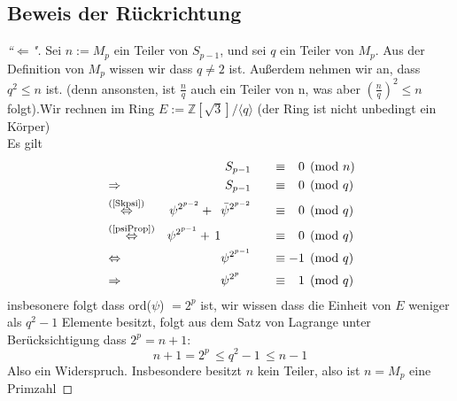 \documentclass{article}
\newcommand{\Integer}{\ensuremath{\mathbb{Z}}}
\begin{document}
\subsection{Beweis der R\"{u}ckrichtung}
\begin{proof}[``$\Leftarrow$"]
Sei $n := M_p$ ein Teiler von $S_{p-1}$, und sei $q$ ein Teiler von $M_p$.
Aus der Definition von $M_p$ wissen wir dass $q\neq2$ ist. Au\ss erdem nehmen wir an, dass $q^2 \leq n$ ist. (denn ansonsten, ist $\frac{n}{q}$ auch ein Teiler von n, was aber $(\frac{n}{q})^2 \leq n$ folgt).Wir rechnen im Ring $E  := \Integer[\sqrt{3}]/\langle q \rangle$ (der Ring ist nicht unbedingt ein K\"{o}rper)\\
Es gilt
\begin{alignat*}{4}
	&\phantom{\Rightarrow a} &S_{p-1} \quad &&\equiv{\phantom{-}0} &\pmod{n} \\
	&\Rightarrow &S_{p-1} 		\quad   &&\equiv{\phantom{-}0} &\pmod{q}\\
	&\overset{\text{(\ref{Skpsi})}}{\Leftrightarrow} &\psi^{2^{p-2}} + \phantom{1}\bar{\psi}^{2^{p-2}} \quad &&\equiv{\phantom{-}0} &\pmod{q}\\
	&\overset{\text{(\ref{psiProp})}}{\Leftrightarrow} &\psi^{2^{p-1}} + \,1 \phantom{\bar{\psi}^{2^{p-2}}} \quad &&\equiv{\phantom{-}0}  &\pmod{q}\\
	&\Leftrightarrow &\psi^{2^{p-1}} \quad &&\equiv{-1} &\pmod{q}\\
	&\Rightarrow &\psi^{2^{p\phantom{-1}}} \quad && \equiv{\phantom{-}1} &\pmod{q}
\end{alignat*}
insbesonere folgt dass ord($\psi$) $ = 2^p$ ist, wir wissen dass die Einheit von $E$ weniger als $q^2 - 1$ Elemente besitzt, folgt aus dem Satz von Lagrange unter Ber\"{u}cksichtigung dass $2^{p} = n + 1$:
\[
	n + 1 = 2^{p} \,\leq q^2-1 \,\leq n - 1
\]
Also ein Widerspruch. Insbesondere besitzt $n$ kein Teiler, also ist $n = M_p$ eine Primzahl
\end{proof}
\end{document}
